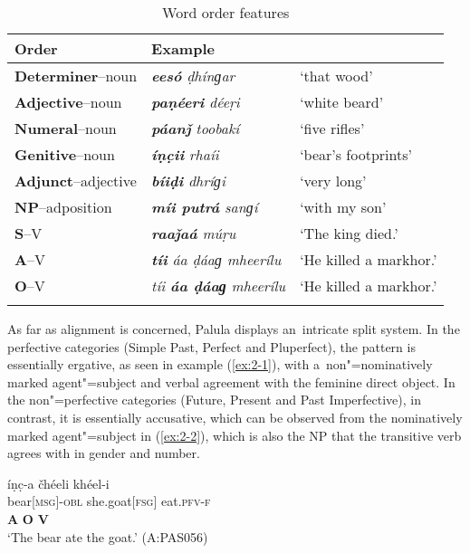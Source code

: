 \begin{table}[ht]
\caption{Word order features}
\begin{tabularx}{\textwidth}{ l l Q }
\lsptoprule
Order &
Example\\\hline
\textbf{Determiner}--noun &
\textit{\textbf{eesó} ḍhínɡar} &
`that wood' \\
\textbf{Adjective}--noun &
\textit{\textbf{paṇéeri} déeṛi} &
`white beard' \\
\textbf{Numeral}--noun &
\textit{\textbf{páanǰ} toobakí} &
`five rifles'\\
\textbf{Genitive}--noun &
\textit{\textbf{íṇc̣ii} rhaíi} &
`bear's footprints'\\
\textbf{Adjunct}--adjective &
\textit{\textbf{bíiḍi} dhríɡi} &
`very long'\\
\textbf{NP}--adposition &
\textit{\textbf{míi putrá} sanɡí} &
`with my son'\\
\textbf{S}--V &
\textit{\textbf{raaǰaá} múṛu} &
`The king died.'\\
\textbf{A}--V &
\textit{\textbf{tíi} áa ḍáaɡ mheerílu} &
`He killed a markhor.' \\
\textbf{O}--V &
\textit{tíi \textbf{áa ḍáaɡ} mheerílu} &
`He killed a markhor.' 
\\\lspbottomrule
\end{tabularx}
\label{tab:2-worder}
\end{table}


As far as alignment is concerned, Palula displays an~intricate split system. In the perfective categories (Simple Past, Perfect and Pluperfect), the pattern is essentially ergative, as seen in example (\ref{ex:2-1}), with a~non"=nominatively marked agent"=subject and verbal agreement with the feminine direct object. In the non"=perfective categories (Future, Present and Past Imperfective), in contrast, it is essentially accusative, which can be observed from the nominatively marked agent"=subject in (\ref{ex:2-2}), which is also the NP that the transitive verb agrees with in gender and number.

\begin{exe}
\ex
\label{ex:2-1}
\glll íṇc̣-a čhéeli khéel-i \\
bear[\textsc{msg}]-\textsc{obl} she.goat[\textsc{fsg}] eat.\textsc{pfv-}\textsc{f}\\
\textbf{A} \textbf{O} \textbf{V}\\
\glt `The bear ate the goat.' (A:PAS056)
\end{exe}


